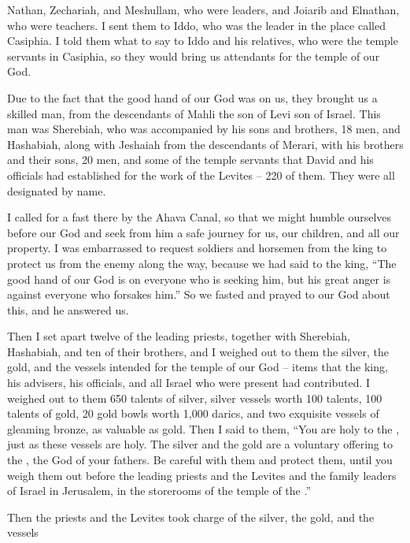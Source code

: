 {Nathan,
Zechariah,
and Meshullam,
who were leaders,
and Joiarib
and Elnathan,
who were teachers.
I sent
them to
Iddo,
who was the leader
in the place
called Casiphia.
I told
them what
to say
to
Iddo
and his relatives,
who were the temple servants
in Casiphia,
so they would bring
us attendants
for the temple
of our God.
\par }{\PP {}Due to the fact that the good
hand
of our God
was on
us, they brought
us a skilled
man,
from the descendants
of Mahli
the son
of Levi
son
of Israel.
This man was Sherebiah,
who was accompanied by his sons
and brothers,
18 men,
and Hashabiah,
along with
Jeshaiah
from the descendants
of Merari,
with his brothers
and their sons,
20 men,
and some
of the temple servants
that David
and his officials
had established for the work
of the Levites
– 220
of them.
They were all
designated
by name.
\par }{\PP {}I called
for a fast
there
by the Ahava
Canal,
so that we might humble
ourselves before
our God
and seek
from
him a safe
journey
for us, our children,
and all
our property.
I
was embarrassed
to request
soldiers
and horsemen
from
the king
to protect us
from the enemy
along the way,
because
we had said
to the king,
“The good
hand
of our God
is on
everyone
who is seeking
him, but his great
anger
is against
everyone
who forsakes him.”
So we fasted
and prayed
to our God
about this,
and he answered us.
\par }{\PP {}Then I set apart
twelve
of the leading
priests,
together with Sherebiah,
Hashabiah,
and ten
of their brothers,
and I weighed
out to them
the silver,
the
gold,
and the
vessels
intended
for the temple
of our God
– items
that the king,
his advisers,
his officials,
and all
Israel
who were present had contributed.
I weighed
out to them 650
talents
of silver,
silver
vessels
worth 100
talents,
100
talents
of gold,
20
gold
bowls
worth 1,000
darics,
and two
exquisite
vessels
of gleaming
bronze,
as valuable
as gold.
Then I said
to them,
“You
are holy
to the
{}, just as these vessels
are holy.
The silver
and the gold
are a voluntary
offering to the
{}, the God
of your fathers.
Be careful
with them and protect
them, until
you weigh
them out before
the leading
priests
and the Levites
and the family
leaders
of Israel
in Jerusalem,
in the storerooms
of the temple
of the {}.”
\par }{\PP {}Then the priests
and the Levites
took
charge
of the silver,
the gold,
and the vessels
}
